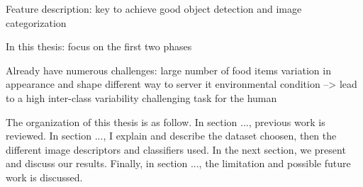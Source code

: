 Feature description: key to achieve good object detection and image categorization

In this thesis: focus on the first two phases

Already have numerous challenges:
large number of food items
variation in appearance and shape
different way to server it
environmental condition
--> lead to a high inter-class variability
challenging task for the human

The organization of this thesis is as follow. In section ..., previous work is reviewed. In section ..., I explain and describe the dataset choosen, then the different image descriptors and classifiers used. In the next section, we present and discuss our results. Finally, in section ..., the limitation and possible future work is discussed.


